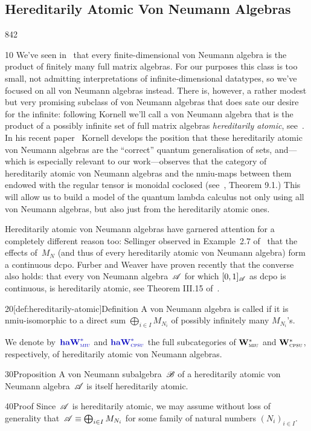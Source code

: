 \subsection{Hereditarily Atomic Von Neumann Algebras}
\begin{parsec}{842}
\begin{point}{10}%
We've seen in~
that every finite-dimensional von Neumann algebra
is the product of finitely many full matrix algebras.
For our purposes this class is too small,
not admitting interpretations of infinite-dimensional
datatypes,
so we've focused on all von Neumann algebras instead.
There is,
however, a rather modest but very promising subclass
of von Neumann algebras
that does sate our desire for the infinite:
following Kornell
we'll call a von Neumann algebra that is the 
    product of a possibly infinite set
of full matrix algebras
\emph{hereditarily atomic}, see~.
In his recent paper~\cite{kornell2018quantum}
Kornell develops the position
that these hereditarily atomic von Neumann 
algebras are the ``correct'' quantum generalisation
of sets, and---which is especially relevant to our work---observes
that the category of hereditarily atomic von Neumann 
algebras and the nmiu-maps between
them endowed with the regular 
tensor is monoidal coclosed (see~\cite{kornell2018quantum}, Theorem 9.1.)
This will allow us to build a model of the quantum lambda calculus
not only using all von Neumann algebras,
but also just from the hereditarily atomic ones.

Hereditarily atomic von Neumann algebras
have garnered attention for a completely different reason too:
Sellinger observed in Example~2.7 of~\cite{selinger2004towards} 
that the effects of~$M_N$
(and thus of every hereditarily atomic von Neumann algebra)
form a continuous dcpo.
Furber and Weaver have proven recently that the converse also holds:
that every von Neumann algebra~$\mathscr{A}$
for which $[0,1]_{\mathscr{A}}$ as dcpo is continuous,
is hereditarily atomic,
see Theorem III.15 of~\cite{furbercontinuous}.
\end{point}
    \begin{point}{20}[def:hereditarily-atomic]{Definition}%
A von Neumann algebra is called %
if it is nmiu-isomorphic
to a direct sum
$\bigoplus_{i\in I} M_{N_i}$
of possibly infinitely many $M_{N_i}$'s.

We denote by~$\Define{\haW{miu}}$ and  $\Define{\haW{cpsu}}$%
the full subcategories of $\mathbf{W}^*_{\text{\textsc{miu}}}$ and $\mathbf{W}^*_{\text{\textsc{cpsu}}}$, respectively,
of hereditarily atomic von Neumann algebras.
\end{point}
\begin{point}{30}{Proposition}%
A von Neumann subalgebra~$\mathscr{B}$ of a hereditarily atomic
von Neumann algebra~$\mathscr{A}$ is itself hereditarily atomic.
\begin{point}{40}{Proof}%
Since~$\mathscr{A}$ is hereditarily atomic, 
we may assume without loss of generality
that~$\mathscr{A} \equiv \bigoplus_{i \in I} M_{N_i}$
for some family of natural numbers $(N_i)_{i\in I}$.


\end{point}
\end{point}
\end{parsec}
